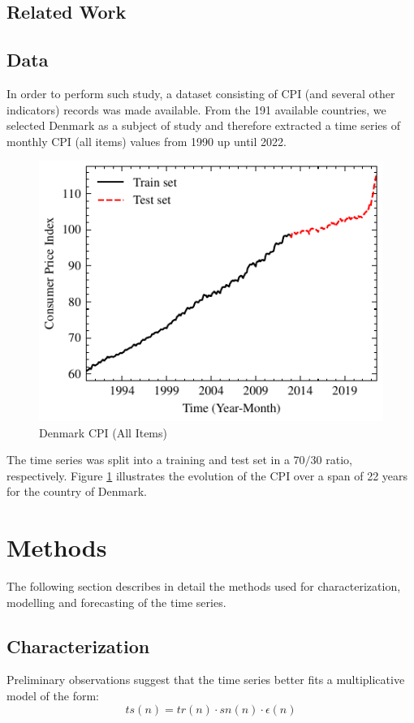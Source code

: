 \documentclass[conference]{IEEEtran}
\begin{document}
\subsection{Related Work}
\subsection{Data}
In order to perform such study, a dataset consisting of CPI (and several other indicators) records was made available. From the 191 available countries, we selected Denmark as a subject of study and therefore extracted a time series of monthly CPI (all items) values from 1990 up until 2022.

\begin{figure}[hbtp]
    \centering
    \includegraphics{../figs/cpi.pdf}
    \caption{Denmark CPI (All Items)}
    \label{fig:cpi}
\end{figure}

The time series was split into a training and test set in a $70/30$ ratio, respectively. Figure \ref{fig:cpi} illustrates the evolution of the CPI over a span of 22 years for the country of Denmark.

\section{Methods}
The following section describes in detail the methods used for characterization, modelling and forecasting of the time series.
\subsection{Characterization}
Preliminary observations suggest that the time series better fits a multiplicative model of the form:
\[
ts(n)=tr(n)\cdot sn(n)\cdot \epsilon(n)
\]
\end{document}
